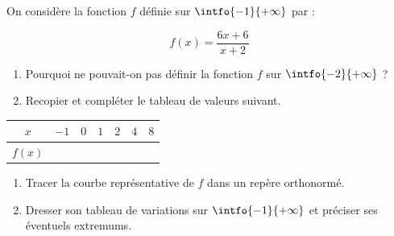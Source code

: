 \begin{exo}{}
	On considère la fonction $f$ définie sur $\intfo{-1}{+\infty}$ par :

	$$f(x) = \frac{6x + 6}{x + 2}$$

	\begin{enumerate}
		\item Pourquoi ne pouvait-on pas définir la fonction $f$ sur $\intfo{-2}{+\infty}$ ?
		\item Recopier et compléter le tableau de valeurs suivant.
	\end{enumerate}

	\begin{center}
		\def\arraystretch{1.4}
		\begin{tabular}{|c|*6{C{0.4cm}|}}
			\hline
			$x$    & $-1$ & $0$ & $1$ & $2$ & $4$ & $8$ \\ \hline
			$f(x)$ &      &     &     &     &     &     \\ \hline
		\end{tabular}
	\end{center}

	\begin{enumerate}[resume]
		\item Tracer la courbe représentative de $f$ dans un repère orthonormé.
		\item Dresser son tableau de variations sur $\intfo{-1}{+\infty}$ et préciser ses éventuels extremums.
	\end{enumerate}
\end{exo}
